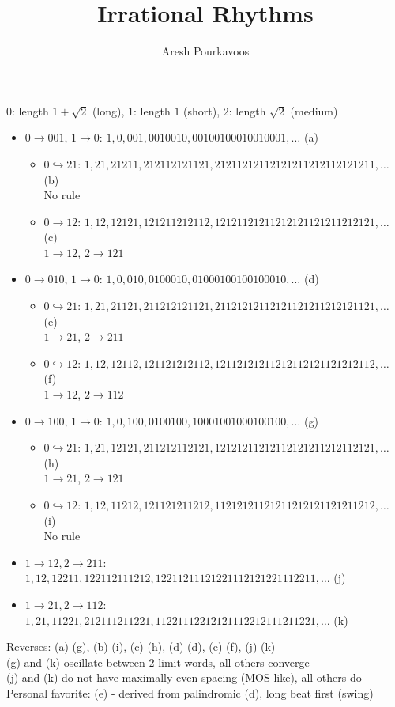 \documentclass{article}
\begin{document}
\title{Irrational Rhythms}
\author{Aresh Pourkavoos}
$0$: length $1+\sqrt{2}$ (long), $1$: length $1$ (short), $2$: length $\sqrt{2}$ (medium)
\begin{itemize}
\item
  $0 \rightarrow 001$, $1 \rightarrow 0$:
  $1, 0, 001, 0010010, 00100100010010001, \ldots$ (a)
  \begin{itemize}
  \item
    $0 \hookrightarrow 21$:
    $1, 21, 21211, 212112121121, 21211212112121211212112121211, \ldots$ (b) \\
    No rule
  \item
    $0 \rightarrow 12$:
    $1, 12, 12121, 121211212112, 12121121211212121121211212121, \ldots$ (c) \\
    $1 \rightarrow 12$, $2 \rightarrow 121$
  \end{itemize}
\item
  $0 \rightarrow 010$, $1 \rightarrow 0$:
  $1, 0, 010, 0100010, 01000100100100010, \ldots$ (d)
  \begin{itemize}
  \item
    $0 \hookrightarrow 21$:
    $1, 21, 21121, 211212121121, 21121212112121121211212121121, \ldots$ (e) \\
    $1 \rightarrow 21$, $2 \rightarrow 211$
  \item
    $0 \hookrightarrow 12$:
    $1, 12, 12112, 121121212112, 12112121211212112121121212112, \ldots$ (f) \\
    $1 \rightarrow 12$, $2 \rightarrow 112$
  \end{itemize}
\item
  $0 \rightarrow 100$, $1 \rightarrow 0$:
  $1, 0, 100, 0100100, 10001001000100100, \ldots$ (g)
  \begin{itemize}
  \item
    $0 \hookrightarrow 21$:
    $1, 21, 12121, 211212112121, 12121211212112121211212112121, \ldots$ (h) \\
    $1 \rightarrow 21$, $2 \rightarrow 121$
  \item
    $0 \hookrightarrow 12$:
    $1, 12, 11212, 121121211212, 11212121121211212121121211212, \ldots$ (i) \\
    No rule
  \end{itemize}
\item $1 \rightarrow 12, 2 \rightarrow 211$:
  $1, 12, 12211, 122112111212, 12211211121221112121221112211, \ldots$ (j)
\item $1 \rightarrow 21, 2 \rightarrow 112$:
  $1, 21, 11221, 212111211221, 11221112212121112212111211221, \ldots$ (k)
\end{itemize}
Reverses: (a)-(g), (b)-(i), (c)-(h), (d)-(d), (e)-(f), (j)-(k) \\
(g) and (k) oscillate between 2 limit words, all others converge \\
(j) and (k) do not have maximally even spacing (MOS-like), all others do \\
Personal favorite: (e) - derived from palindromic (d), long beat first (swing)
\end{document}
